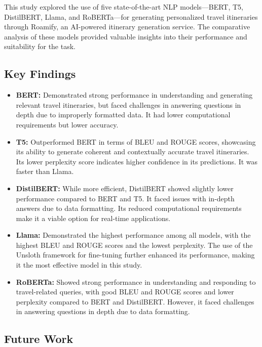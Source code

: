 \documentclass[conference]{IEEEtran}
\begin{document}
    This study explored the use of five state-of-the-art NLP models—BERT, T5, DistilBERT, Llama, and RoBERTa—for generating personalized travel itineraries through Roamify, an AI-powered itinerary generation service. The comparative analysis of these models provided valuable insights into their performance and suitability for the task.

    \subsection{Key Findings}

        \begin{itemize}
            \item \textbf{BERT:} Demonstrated strong performance in understanding and generating relevant travel itineraries, but faced challenges in answering questions in depth due to improperly formatted data. It had lower computational requirements but lower accuracy.
            \item \textbf{T5:} Outperformed BERT in terms of BLEU and ROUGE scores, showcasing its ability to generate coherent and contextually accurate travel itineraries. Its lower perplexity score indicates higher confidence in its predictions. It was faster than Llama.
            \item \textbf{DistilBERT:} While more efficient, DistilBERT showed slightly lower performance compared to BERT and T5. It faced issues with in-depth answers due to data formatting. Its reduced computational requirements make it a viable option for real-time applications.
            \item \textbf{Llama:} Demonstrated the highest performance among all models, with the highest BLEU and ROUGE scores and the lowest perplexity. The use of the Unsloth framework for fine-tuning further enhanced its performance, making it the most effective model in this study.
            \item \textbf{RoBERTa:} Showed strong performance in understanding and responding to travel-related queries, with good BLEU and ROUGE scores and lower perplexity compared to BERT and DistilBERT. However, it faced challenges in answering questions in depth due to data formatting.
        \end{itemize}

    \subsection{Future Work}
\end{document}
